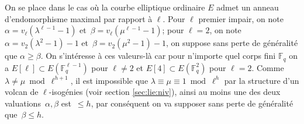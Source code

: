 \documentclass[10pt,a4paper]{book}
\theoremstyle{plain}
\theoremstyle{definition}
\theoremstyle{definition}
\theoremstyle{definition}
\theoremstyle{definition}
\theoremstyle{remark}
\theoremstyle{remark}
\theoremstyle{definition}
\begin{document}
On se place dans le cas où la courbe elliptique ordinaire $E$ admet un anneau d'endomorphisme maximal par rapport à $\ell$.
 Pour $\ell$ premier impair, on note~$\alpha
= v_{\ell}(\lambda^{\ell-1}-1)$ et~$\beta=v_{\ell}(\mu^{\ell-1}-1)$; pour $\ell=2$,
on note~$\alpha=v_2(\lambda^2-1)-1$ et~$\beta = v_2(\mu^2-1)-1$, on suppose 
sans perte de généralité que $\alpha \geqslant \beta$. On s'intéresse à ces valeurs-là car pour n'importe quel corps fini $\mathbb{F}_q$ on a $E[\ell] \subset E(\mathbb{F}_q^{\ell-1})$ pour $\ell \neq 2$ et $E[4] \subset E(\mathbb{F}_q^{2})$ pour $\ell=2$.  Comme $\lambda \neq \mu \bmod{\ell^{h+1}}$, il est
impossible que $\lambda \equiv \mu \equiv 1 \bmod{\ell^h}$ par la structure 
d'un volcan de $\ell$-isogénies (voir section \ref{sec:lie:niv}), ainsi au moins une des deux
valuations~$\alpha, \beta$ est~$\leqslant h$, par conséquent on va supposer sans perte de généralité que~$\beta \leqslant h$.
\end{document}

